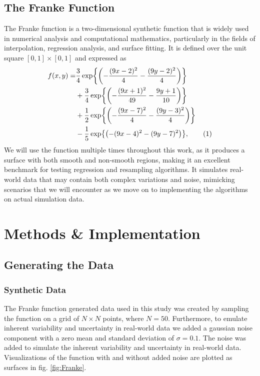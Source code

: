\documentclass[aps,pra,english,notitlepage,reprint,nofootinbib]{revtex4-1}  %
\newcommand\numberthis{\addtocounter{equation}{1}\tag{\theequation}}
\begin{document}
\vspace*{-2.5pt}
\subsection{The Franke Function}\label{subsec:franke}
\vspace*{-2.5pt}
The Franke function is a two-dimensional synthetic function that is widely used in numerical analysis and computational mathematics, particularly in the fields of interpolation, regression analysis, and surface fitting. It is defined over the unit square $[0, 1] \times [0, 1]$ and expressed as
\begin{align*}
  f(x,y) =& \frac{3}{4} \exp{\left( -\frac{(9x - 2)^2}{4} - \frac{(9y - 2)^2}{4} \right)} \\
&+ \frac{3}{4} \exp{\left( -\frac{(9x + 1)^2}{49} - \frac{9y + 1}{10} \right)} \\
&+ \frac{1}{2} \exp{\left( -\frac{(9x - 7)^2}{4} - \frac{(9y - 3)^2}{4} \right)} \\
&- \frac{1}{5} \exp{\left( -(9x - 4)^2 - (9y - 7)^2 \right)}, \numberthis\label{eq:Franke}
\end{align*}
We will use the function multiple times throughout this work, as it produces a surface with both smooth and non-smooth regions, making it an excellent benchmark for testing regression and resampling algorithms. It simulates real-world data that may contain both complex variations and noise, mimicking scenarios that we will encounter as we move on to implementing the algorithms on actual simulation data.


\section{Methods \& Implementation}\label{sec:methods}
\subsection{Generating the Data}
\subsubsection{Synthetic Data}
The Franke function generated data used in this study was created by sampling the function on a grid of $N\times N$ points, where $N=50$. Furthermore, to emulate inherent variability and uncertainty in real-world data we added a gaussian noise component with a zero mean and standard deviation of $\sigma = 0.1$. The noise was added to simulate the inherent variability and uncertainty in real-world data. Visualizations of the function with and without added noise are plotted as surfaces in fig. \ref{fig:Franke}.
\end{document}
